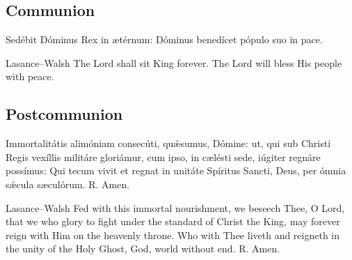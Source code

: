\subsection{Communion}
\label{proper-communion}
\begin{latinproper}
Sedébit Dóminus Rex in ætérnum: Dóminus benedícet pópulo suo in pace.
\end{latinproper}
\begin{englishwitness}{Lasance--Walsh}
The Lord shall sit King forever. The Lord will bless His people with peace.
\end{englishwitness}
\clearpage
\subsection{Postcommunion}
\label{proper-postcommunion}
\begin{latinproper}
Immortalitátis alimóniam consecúti, quǽsumus, Dómine: ut, qui sub Christi Regis vexíllis militáre gloriámur, cum ipso, in cælésti sede, iúgiter regnáre possímus: Qui tecum vivit et regnat in unitáte Spíritus Sancti, Deus, per ómnia sǽcula sæculórum. \textnormal{R.} Amen.
\end{latinproper}
\begin{englishwitness}{Lasance--Walsh}
Fed with this immortal nourishment, we beseech Thee, O Lord, that we who glory to fight under the standard of Christ the King, may forever reign with Him on the heavenly throne. Who with Thee liveth and reigneth in the unity of the Holy Ghost, God, world without end. \textnormal{R.} Amen.
\end{englishwitness}
